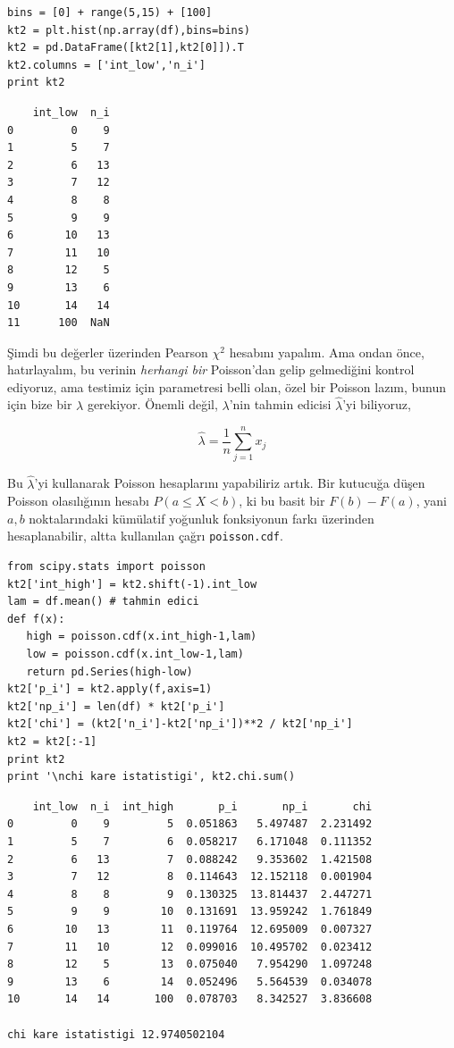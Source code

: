 \documentclass[12pt,fleqn]{article}\usepackage{../../common}
\begin{document}
\begin{verbatim}
bins = [0] + range(5,15) + [100]
kt2 = plt.hist(np.array(df),bins=bins)
kt2 = pd.DataFrame([kt2[1],kt2[0]]).T
kt2.columns = ['int_low','n_i']
print kt2
\end{verbatim}

\begin{verbatim}
    int_low  n_i
0         0    9
1         5    7
2         6   13
3         7   12
4         8    8
5         9    9
6        10   13
7        11   10
8        12    5
9        13    6
10       14   14
11      100  NaN
\end{verbatim}

Şimdi bu değerler üzerinden Pearson $\chi^2$ hesabını yapalım. Ama ondan
önce, hatırlayalım, bu verinin {\em herhangi bir} Poisson'dan gelip
gelmediğini kontrol ediyoruz, ama testimiz için parametresi belli olan,
özel bir Poisson lazım, bunun için bize bir $\lambda$ gerekiyor. Önemli
değil, $\lambda$'nin tahmin edicisi $\hat{\lambda}$'yi biliyoruz,

$$ \hat{\lambda} = \frac{1}{n} \sum_{j=1}^{n}x_j $$

Bu $\hat{\lambda}$'yi kullanarak Poisson hesaplarını yapabiliriz artık. Bir
kutucuğa düşen Poisson olasılığının hesabı $P(a \le X < b)$, ki bu basit
bir $F(b)-F(a)$, yani $a,b$ noktalarındaki kümülatif yoğunluk fonksiyonun
farkı üzerinden hesaplanabilir, altta kullanılan çağrı \verb!poisson.cdf!.

\begin{verbatim}
from scipy.stats import poisson
kt2['int_high'] = kt2.shift(-1).int_low
lam = df.mean() # tahmin edici
def f(x): 
   high = poisson.cdf(x.int_high-1,lam)
   low = poisson.cdf(x.int_low-1,lam)
   return pd.Series(high-low)
kt2['p_i'] = kt2.apply(f,axis=1)
kt2['np_i'] = len(df) * kt2['p_i']
kt2['chi'] = (kt2['n_i']-kt2['np_i'])**2 / kt2['np_i']
kt2 = kt2[:-1]
print kt2
print '\nchi kare istatistigi', kt2.chi.sum()
\end{verbatim}

\begin{verbatim}
    int_low  n_i  int_high       p_i       np_i       chi
0         0    9         5  0.051863   5.497487  2.231492
1         5    7         6  0.058217   6.171048  0.111352
2         6   13         7  0.088242   9.353602  1.421508
3         7   12         8  0.114643  12.152118  0.001904
4         8    8         9  0.130325  13.814437  2.447271
5         9    9        10  0.131691  13.959242  1.761849
6        10   13        11  0.119764  12.695009  0.007327
7        11   10        12  0.099016  10.495702  0.023412
8        12    5        13  0.075040   7.954290  1.097248
9        13    6        14  0.052496   5.564539  0.034078
10       14   14       100  0.078703   8.342527  3.836608

chi kare istatistigi 12.9740502104
\end{verbatim}
\end{document}
